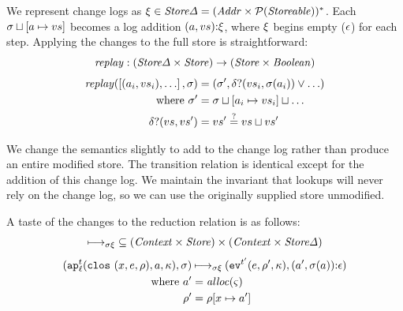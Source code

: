 \documentclass[9pt]{sigplanconf} %
\begin{document}
We represent change logs as $\msdiff \in \StoreDelta = (\Addr \times \Set(\Storeable))^*$.
%
 Each $\msto\sqcup[\maddr \mapsto \mval{s}]$ becomes a log addition $\cons{\ttuple{\maddr}{\mval{s}}}{\msdiff}$, where $\msdiff$ begins empty ($\mtlst$) for each step.
%
 Applying the changes to the full store is straightforward:
\begin{equation*}
\replay : (\StoreDelta \times \Store) \to (\Store \times \Boolean)
\end{equation*}
\begin{align*}
\replay(\left[ \ttuple{\maddr_i}{\mval{s_i}}, \ldots\right], \msto) &=
\ttuple{\msto'}
       {\diffp(\mval{s_i}, \msto(\maddr_i)) \vee \ldots} \\
\text{ where } \msto' &= {\msto \sqcup [\maddr_i \mapsto \mval{s_i}] \sqcup \ldots} \\
\diffp(\mval{s}, \mval{s'}) &= \mval{s'} \overset{?}{=} \mval{s} \sqcup \mval{s'}
\end{align*}

We change the semantics slightly to add to the change log rather than produce an entire modified store.
%
The transition relation is identical except for the addition of this change log.
%
  We maintain the invariant that lookups will never rely on the change log, so we can use the originally supplied store unmodified.

A taste of the changes to the reduction relation is as follows:
\begin{equation*}
\dmachstep \subseteq (\Context\times\Store) \times (\Context\times\StoreDelta) 
\end{equation*}
\begin{align*}
\ttuple{\ap[^\mcntr_\mlab]{\clos{\mvar,\mexp,\menv},\maddr,\mkont}}{\msto} & \dmachstep
\ttuple{\ev[^{\mcntr'}]{\mexp,\menv',\mkont}}{\cons{\ttuple{\maddr'}{\msto(\maddr)}}{\epsilon}} \\
\text{ where }\maddr' &= \alloc(\mstate) \\
              \menv' &= \menv[\mvar\mapsto\maddr']
\end{align*}

\end{document}
